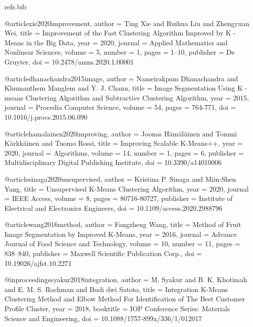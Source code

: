 \begin{filecontents*}[overwrite]{refs.bib}

@article{xie2020improvement,
  author = {Ting Xie and Ruihua Liu and Zhengyuan Wei},
  title = {{Improvement of the Fast Clustering Algorithm Improved by K -Means in the Big Data}},
  year = {2020},
  journal = {Applied Mathematics and Nonlinear Sciences},
  volume = {5},
  number = {1},
  pages = {1--10},
  publisher = {De Gruyter},
  doi = {10.2478/amns.2020.1.00001}
}

@article{dhanachandra2015image,
  author = {Nameirakpam Dhanachandra and Khumanthem Manglem and Y. J. Chanu},
  title = {{Image Segmentation Using K -means Clustering Algorithm and Subtractive Clustering Algorithm}},
  year = {2015},
  journal = {Procedia Computer Science},
  volume = {54},
  pages = {764-771},
  doi = {10.1016/j.procs.2015.06.090}
}

@article{hamalainen2020improving,
  author = {Joonas H{\"a}m{\"a}l{\"a}inen and Tommi K{\"a}rkk{\"a}inen and Tuomo Rossi},
  title = {{Improving Scalable K-Means++}},
  year = {2020},
  journal = {Algorithms},
  volume = {14},
  number = {1},
  pages = {6},
  publisher = {Multidisciplinary Digital Publishing Institute},
  doi = {10.3390/a14010006}
}

@article{sinaga2020unsupervised,
  author = {Kristina P. Sinaga and Miin-Shen Yang},
  title = {{Unsupervised K-Means Clustering Algorithm}},
  year = {2020},
  journal = {IEEE Access},
  volume = {8},
  pages = {80716-80727},
  publisher = {Institute of Electrical and Electronics Engineers},
  doi = {10.1109/access.2020.2988796}
}

@article{wang2016method,
  author = {Fangzheng Wang},
  title = {{Method of Fruit Image Segmentation by Improved K-Means}},
  year = {2016},
  journal = {Advance Journal of Food Science and Technology},
  volume = {10},
  number = {11},
  pages = {838--840},
  publisher = {Maxwell Scientific Publication Corp.},
  doi = {10.19026/ajfst.10.2271}
}

@inproceedings{syakur2018integration,
  author = {M. Syakur and B. K. Khotimah and E. M. S. Rochman and Budi dwi Satoto},
  title = {{Integration K-Means Clustering Method and Elbow Method For Identification of The Best Customer Profile Cluster}},
  year = {2018},
  booktitle = {IOP Conference Series: Materials Science and Engineering},
  doi = {10.1088/1757-899x/336/1/012017}
}


\end{filecontents*}
